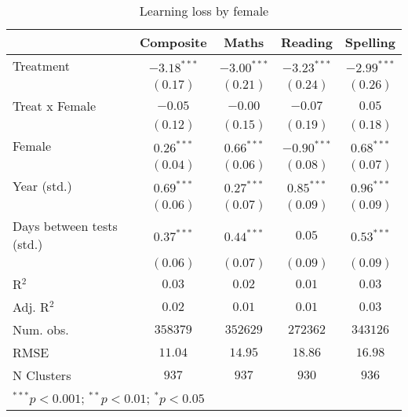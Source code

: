 
\begin{table}
\begin{center}
\begin{tabular}{l c c c c}
\hline
 & Composite & Maths & Reading & Spelling \\
\hline
Treatment                 & $-3.18^{***}$ & $-3.00^{***}$ & $-3.23^{***}$ & $-2.99^{***}$ \\
                          & $(0.17)$      & $(0.21)$      & $(0.24)$      & $(0.26)$      \\
Treat x Female            & $-0.05$       & $-0.00$       & $-0.07$       & $0.05$        \\
                          & $(0.12)$      & $(0.15)$      & $(0.19)$      & $(0.18)$      \\
Female                    & $0.26^{***}$  & $0.66^{***}$  & $-0.90^{***}$ & $0.68^{***}$  \\
                          & $(0.04)$      & $(0.06)$      & $(0.08)$      & $(0.07)$      \\
Year (std.)               & $0.69^{***}$  & $0.27^{***}$  & $0.85^{***}$  & $0.96^{***}$  \\
                          & $(0.06)$      & $(0.07)$      & $(0.09)$      & $(0.09)$      \\
Days between tests (std.) & $0.37^{***}$  & $0.44^{***}$  & $0.05$        & $0.53^{***}$  \\
                          & $(0.06)$      & $(0.07)$      & $(0.09)$      & $(0.09)$      \\
\hline
R$^2$                     & $0.03$        & $0.02$        & $0.01$        & $0.03$        \\
Adj. R$^2$                & $0.02$        & $0.01$        & $0.01$        & $0.03$        \\
Num. obs.                 & $358379$      & $352629$      & $272362$      & $343126$      \\
RMSE                      & $11.04$       & $14.95$       & $18.86$       & $16.98$       \\
N Clusters                & $937$         & $937$         & $930$         & $936$         \\
\hline
\multicolumn{5}{l}{\scriptsize{$^{***}p<0.001$; $^{**}p<0.01$; $^{*}p<0.05$}}
\end{tabular}
\caption{Learning loss by female}
\label{tablefemale}
\end{center}
\end{table}
